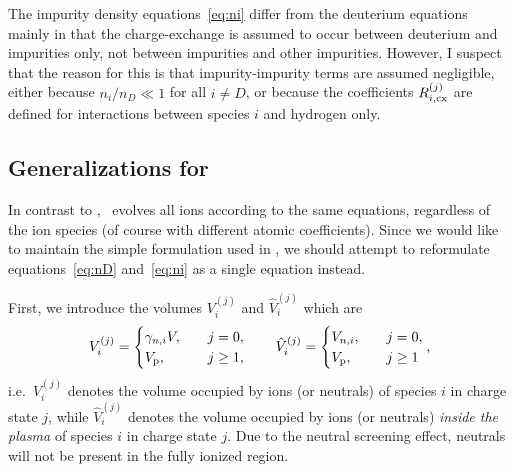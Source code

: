 \documentclass{notes}
\newcommand{\tDREAM}{{\mdseries\DREAM}}
\newcommand{\Vp}{V_{\rm p}}
\begin{document}
    The impurity density equations~\eqref{eq:ni} differ from the deuterium
    equations mainly in that the charge-exchange is assumed to occur between
    deuterium and impurities only, not between impurities and other impurities.
    However, I suspect that the reason for this is that impurity-impurity terms
    are assumed negligible, either because $n_i/n_D\ll 1$ for all $i\neq D$, or
    because the coefficients $R_{i,{\rm cx}}^{(j)}$ are defined for interactions
    between species $i$ and hydrogen only.

    \subsection{Generalizations for \tDREAM}
    In contrast to \DYON, \DREAM\ evolves all ions according to the same
    equations, regardless of the ion species (of course with different atomic
    coefficients). Since we would like to maintain the simple formulation used
    in \DREAM, we should attempt to reformulate equations~\eqref{eq:nD}
    and~\eqref{eq:ni} as a single equation instead.

    First, we introduce the volumes $V_i^{(j)}$ and $\hat{V}_i^{(j)}$ which
    are
    \begin{equation}
        V_i^{(j)} = \begin{cases}
            \gamma_{n,i}V,&\quad j=0,\\
            \Vp, &\quad j\geq 1, 
        \end{cases}\qquad
        \hat{V}_i^{(j)} = \begin{cases}
            V_{n,i}, &\quad j=0,\\
            \Vp, &\quad j\geq 1
        \end{cases},
    \end{equation}
    i.e.\ $V_i^{(j)}$ denotes the volume occupied by ions (or neutrals) of
    species $i$ in charge state $j$, while $\hat{V}_i^{(j)}$ denotes the
    volume occupied by ions (or neutrals) \emph{inside the plasma} of species
    $i$ in charge state $j$. Due to the neutral screening effect, neutrals will
    not be present in the fully ionized region.
\end{document}
